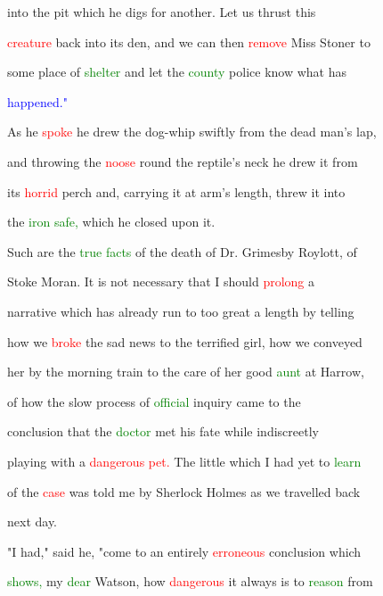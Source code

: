  into the pit which he digs for another. Let us thrust this

 \textcolor{red}{creature} back into its den, and we can then \textcolor{red}{remove} Miss Stoner to

 some place of \textcolor{green}{shelter} and let the \textcolor{green}{county} \textcolor{BurntOrange}{police} know what has

 \textcolor{blue}{happened."}



 As he \textcolor{red}{spoke} he drew the dog-whip swiftly from the dead man's lap,

 and throwing the \textcolor{red}{noose} round the reptile's neck he drew it from

 its \textcolor{red}{horrid} perch and, carrying it at arm's length, threw it into

 the \textcolor{green}{iron} \textcolor{green}{safe,} which he closed upon it.



 Such are the \textcolor{green}{true} \textcolor{green}{facts} of the \textcolor{BurntOrange}{death} of Dr. Grimesby Roylott, of

 Stoke Moran. It is not necessary that I should \textcolor{red}{prolong} a

 narrative which has already run to too great a length by telling

 how we \textcolor{red}{broke} the sad news to the terrified girl, how we conveyed

 her by the morning train to the care of her \textcolor{BurntOrange}{good} \textcolor{green}{aunt} at Harrow,

 of how the slow process of \textcolor{green}{official} \textcolor{BurntOrange}{inquiry} came to the

 conclusion that the \textcolor{green}{doctor} met his \textcolor{BurntOrange}{fate} while indiscreetly

 playing with a \textcolor{red}{dangerous} \textcolor{red}{pet.} The little which I had yet to \textcolor{green}{learn}

 of the \textcolor{red}{case} was told me by Sherlock Holmes as we travelled back

 next day.



 "I had," said he, "come to an entirely \textcolor{red}{erroneous} conclusion which

 \textcolor{green}{shows,} my \textcolor{green}{dear} Watson, how \textcolor{red}{dangerous} it always is to \textcolor{green}{reason} from

